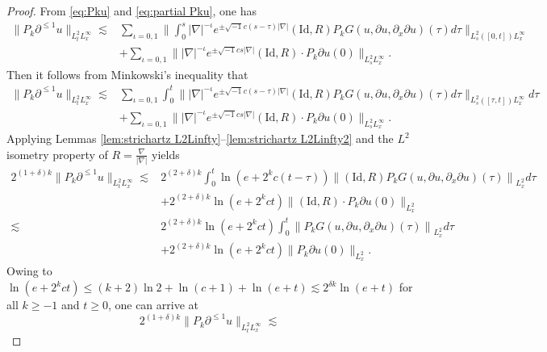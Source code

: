 \documentclass[11pt,twoside]{article}
\def\f{\frac}
\def\p{\partial}
\def\ls{\lesssim}
\theoremstyle{plain}
\theoremstyle{definition}
\numberwithin{equation}{section}
\begin{document}
\begin{proof}
	From \eqref{eq:Pku} and \eqref{eq:partial Pku}, one has
	\begin{equation*}
	\begin{split}
	\|P_k\p^{\le 1} u\|_{L^{2}_tL^\infty_x}
	\ls
	&\sum_{\iota=0,1}\big\|\int_{0}^{s} |\nabla|^{-\iota}e^{\pm \sqrt{-1}c(s-\tau)|\nabla|} (\mathrm{Id},R) P_k G(u,\p u,\p_x\p u)(\tau)d\tau\big\|_{L^{2}_s([0,t])L^\infty_x}\\
	&+\sum_{\iota=0,1}\||\nabla|^{-\iota}e^{\pm \sqrt{-1}cs|\nabla|}(\mathrm{Id},R)\cdot P_k\partial u(0)\|_{L^{2}_sL^\infty_x}.
	\end{split}
	\end{equation*}
	Then it follows from Minkowski's inequality that
	\begin{equation*}
	\begin{split}
	\|P_k\p^{\le 1} u\|_{L^{2}_tL^\infty_x}
	\ls
	&\sum_{\iota=0,1}\int_{0}^{t}\big\| |\nabla|^{-\iota}e^{\pm \sqrt{-1}c(s-\tau)|\nabla|} (\mathrm{Id},R) P_k G(u,\p u,\p_x\p u)(\tau)d\tau\big\|_{L^{2}_s([\tau,t])L^\infty_x}d\tau\\
	&+\sum_{\iota=0,1}\||\nabla|^{-\iota}e^{\pm \sqrt{-1}cs|\nabla|}(\mathrm{Id},R)\cdot P_k\partial u(0)\|_{L^{2}_sL^\infty_x}.
	\end{split}
	\end{equation*}
	Applying Lemmas \ref{lem:strichartz L2Linfty}--\ref{lem:strichartz L2Linfty2} and the $L^2$ isometry property of $R = \f{\nabla}{|\nabla|}$
 yields
	\begin{equation}\label{inbootstrap1}
	\begin{split}
	2^{(1+\delta) k}\|P_k\p^{\le 1 } u\|_{L^{2}_tL^\infty_x}
	\ls
	&2^{(2+\delta) k}
	\int_{0}^{t}\ln(e+2^k c(t-\tau))\left\|(\mathrm{Id},R) P_k G(u,\p u,\p_x\p u)(\tau)\right\|_{L^2_x}d\tau\\
	&+2^{(2+\delta) k}\ln(e+2^k ct)\|(\mathrm{Id},R)\cdot P_k\partial u(0)\|_{L^2_x}\\
	\ls
	&2^{(2+\delta) k}\ln(e+2^k ct)
	\int_{0}^{t}\left\| P_kG(u,\p u,\p_x\p u)(\tau)\right\|_{L^2_x}d\tau\\
	&+2^{(2+\delta) k}\ln(e+2^k ct)\|P_k\p u(0)\|_{L^2_x}.
	\end{split}
	\end{equation}
	Owing to $\ln(e+2^k ct)\le (k+2)\ln2+\ln(c+1)+\ln(e+t) \ls 2^{\delta k}\ln(e+t)$ for all $k\ge-1$ and $t\ge0$,
one can arrive at
	\begin{equation}\label{3.12}
		2^{(1+\delta) k}\|P_k\p^{\le1} u\|_{L^{2}_tL^\infty_x}
		\ls

\end{equation}
\end{proof}
\end{document}
